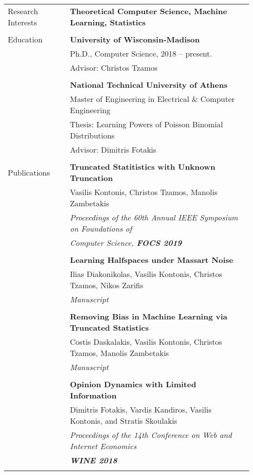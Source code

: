 \documentclass[letterpaper,11pt,oneside]{article}
\begin{document}
\noindent \begin{longtable}{@{} l l}
\Large{Research Interests} & \textbf{Theoretical Computer Science, Machine Learning, Statistics}
\\
&\\
 \Large{Education}

     & \textbf{University of Wisconsin-Madison} \\
     & Ph.D., Computer Science, 2018 -- present. \\
     & Advisor: Christos Tzamos\\
     & \\

     & \textbf{National Technical University of Athens} \\
     & Master of Engineering in Electrical \& Computer Engineering\\
     & Thesis: Learning Powers of Poisson Binomial Distributions\\
     & Advisor: Dimitris Fotakis \\
     & \\

 \Large{Publications}

     & \textbf{Truncated Statitistics with Unknown Truncation} \\
     & Vasilis Kontonis, Christos Tzamos, Manolis Zambetakis\\
     & \emph{Proceedings of the 60th Annual IEEE Symposium on Foundations of}\\
     & \emph{Computer Science, \textbf{FOCS 2019}}\\
     & \\

     & \textbf{Learning Halfspaces under Massart Noise} \\
     & Ilias Diakonikolas, Vasilis Kontonis, Christos Tzamos, Nikos Zarifis \\
     & \emph{Manuscript} \\
     & \\

     & \textbf{Removing Bias in Machine Learning via Truncated Statistics} \\
     & Costis Daskalakis, Vasilis Kontonis, Christos Tzamos, Manolis Zambetakis\\
     & \emph{Manuscript} \\
     & \\

     & \textbf{Opinion Dynamics with Limited Information} \\
     & Dimitris Fotakis, Vardis Kandiros, Vasilis Kontonis, and Stratis Skoulakis\\
     & \emph{Proceedings of the 14th Conference on Web and Internet Economics} \\
     & \emph{\textbf{WINE 2018}} \\
     & \\


\end{longtable}
\end{document}
